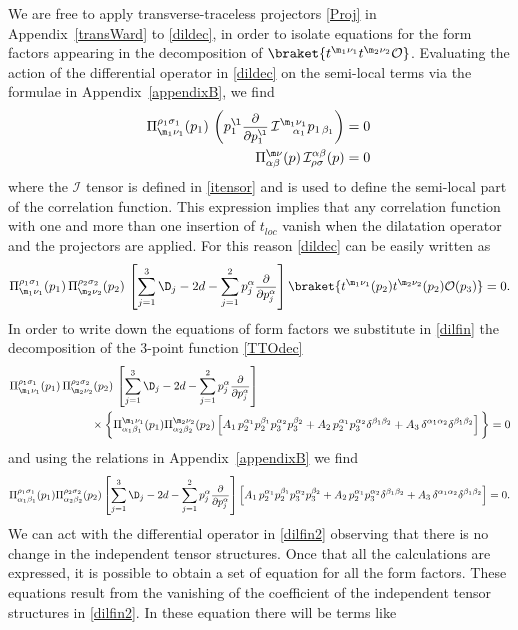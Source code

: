 \documentclass[a4paper,11pt,openright,twoside]{book}
\newcommand{\mO}{\mathcal{O}}
\let\a=\alpha   \let\b=\beta   \let\g=\gamma   \let\d=\delta
\let\n=\nu      \let\x=\xi     \let\p=\pi      \let\r=\rho
\let\s=\sigma  \let\t=\tau     \let\u=\upsilon \let\f=\phi
\newcommand{\sdfrac}[2]{\mbox{\small$\displaystyle\frac{#1}{#2}$}}
\newcommand{\appref}[1]{Appendix~\ref{#1}}		%
\numberwithin{equation}{section}
\begin{document}
{{We are free to apply transverse-traceless projectors \eqref{Proj} in \appref{transWard} to \eqref{dildec}, in order to isolate equations for the form factors appearing in the decomposition of $\braket{t^{\m_1\n_1}t^{\m_2\n_2}\mO}$. Evaluating the action of the differential operator in \eqref{dildec} on the semi-local terms via the formulae in \appref{appendixB}, we find 
\begin{align}
	\Pi^{\r_1\s_1}_{\m_1\n_1}(p_1)\,\left(p_1^\l\sdfrac{\partial}{\partial p_1^\l}\,\mathcal{I}^{\m_1\n_1}_{\ \ \ \a_1}p_{1\,\b_1}\right)&=0\,\\
	\Pi^{\m\n}_{\a\b}(p)\,\mathcal{I}^{\a\b}_{\r\s}(p)&=0
\end{align}
where the $\mathcal{I}$ tensor is defined in \eqref{itensor} and is used to define the semi-local part of the correlation function. This expression implies that any correlation function with one and more than one insertion of $t_{loc}$ vanish when the dilatation operator and the projectors are applied. For this reason \eqref{dildec} can be easily written as
\begin{equation}
	\Pi^{\r_1\s_1}_{\m_1\n_1}(p_1)\,\Pi^{\r_2\s_2}_{\m_2\n_2}(p_2)\,\left[\sum_{j=1}^3\D_j-2d-\sum_{j=1}^{2}p_j^\a\sdfrac{\partial}{\partial p_j^\a}\right]\braket{t^{\m_1\n_1}(p_2)t^{\m_2\n_2}(p_2)\mO(p_3)}=0.\label{dilfin}
\end{equation}
In order to write down the equations of form factors we substitute in \eqref{dilfin} the decomposition of the 3-point function \eqref{TTOdec} 
\begin{align}
	&\Pi^{\r_1\s_1}_{\m_1\n_1}(p_1)\,\Pi^{\r_2\s_2}_{\m_2\n_2}(p_2)\,\left[\sum_{j=1}^3\D_j-2d-\sum_{j=1}^{2}p_j^\a\sdfrac{\partial}{\partial p_j^\a}\right]\notag\\
	&\hspace{2.5cm}\times\bigg\{\Pi^{\m_1\n_1}_{\a_1\b_1}(p_1)\Pi^{\m_2\n_2}_{\a_2\b_2}(p_2)\left[A_1\,p_2^{\a_1}p_2^{\b_1}p_3^{\a_2}p_3^{\b_2}+A_2\,p_2^{\a_1}p_3^{\a_2}\d^{\b_1\b_2}+A_3\,\d^{\a_1\a_2}\d^{\b_1\b_2}\right]\bigg\}=0
\end{align}
and using the relations in \appref{appendixB} we find
\begin{equation}
	\Pi^{\r_1\s_1}_{\a_1\b_1}(p_1)\Pi^{\r_2\s_2}_{\a_2\b_2}(p_2)\left[\sum_{j=1}^3\D_j-2d-\sum_{j=1}^{2}p_j^\a\sdfrac{\partial}{\partial p_j^\a}\right]\left[A_1\,p_2^{\a_1}p_2^{\b_1}p_3^{\a_2}p_3^{\b_2}+A_2\,p_2^{\a_1}p_3^{\a_2}\d^{\b_1\b_2}+A_3\,\d^{\a_1\a_2}\d^{\b_1\b_2}\right]=0.\label{dilfin2}
\end{equation}
We can act with the differential operator in \eqref{dilfin2} observing that there is no change in the independent tensor structures. Once that all the calculations are expressed, it is possible to obtain a set of equation for all the form factors. These equations result from the vanishing of the coefficient of the independent tensor structures in \eqref{dilfin2}. In these equation there will be terms like
}}
\end{document}
